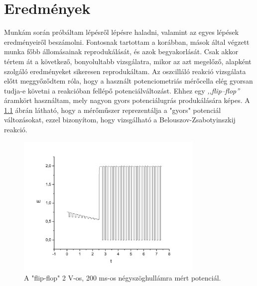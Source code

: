 \chapter{Eredmények}
\pagestyle{headings}

\def\s{0.5}
Munkám során próbáltam lépésről lépésre haladni, valamint az egyes lépések eredményeiről beszámolni. Fontosnak tartottam a korábban, mások által végzett munka főbb állomásainak reprodukálását, és azok begyakorlását. Csak akkor tértem át a következő, bonyolultabb vizsgálatra, mikor az azt megelőző, alapként szolgáló eredményeket sikeresen reprodukáltam. Az oszcilláló reakció vizsgálata előtt meggyőződtem róla, hogy a használt potenciometriás mérőcella elég gyorsan tudja-e követni a reakcióban fellépő potenciálváltozást. Ehhez egy \emph{,,flip--flop''} áramkört használtam, mely nagyon gyors potenciálugrás produkálására képes. A \ref{fig:square} ábrán látható, hogy a mérőműszer reprezentálja a "gyors" potenciál változásokat, ezzel bizonyítom, hogy vizsgálható a Belouszov-Zsabotyinszkij reakció.

\begin{figure}
\centering
\includegraphics[width=0.8\textwidth]{img/square.jpg}
\caption{A "flip-flop" 2 V-os, 200 ms-os négyszöghullámra mért potenciál.}
\label{fig:square}
\end{figure}

